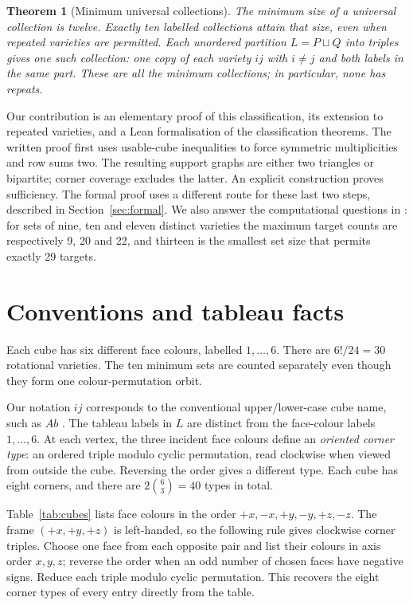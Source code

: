 \documentclass[11pt]{article}
\newtheorem{theorem}{Theorem}
\begin{document}
\begin{theorem}[Minimum universal collections]\label{thm:main}
The minimum size of a universal collection is twelve. Exactly ten labelled
collections attain that size, even when repeated varieties are permitted.
Each unordered partition $L=P\sqcup Q$ into triples gives one such
collection: one copy of each variety $ij$ with $i\ne j$ and both labels
in the same part. These are all the minimum collections; in particular, none has repeats.
\end{theorem}

Our contribution is an elementary proof of this classification, its extension
to repeated varieties, and a Lean formalisation of the classification
theorems. The written proof first uses usable-cube inequalities to force
symmetric multiplicities and row sums two. The resulting support graphs are
either two triangles or bipartite; corner coverage excludes the latter.
An explicit construction proves sufficiency. The formal proof uses a different
route for these last two steps, described in Section~\ref{sec:formal}.
We also answer the computational questions in \cite[Section~6]{JR}: for
sets of nine, ten and eleven distinct varieties the maximum target counts
are respectively 9, 20 and 22, and thirteen is the smallest set size
that permits exactly 29 targets.

\section{Conventions and tableau facts}\label{sec:tableau}
Each cube has six different face colours, labelled $1,\ldots,6$.
There are $6!/24=30$ rotational varieties. The ten minimum sets are counted
separately even though they form one colour-permutation orbit.

Our notation $ij$ corresponds to the conventional upper/lower-case cube
name, such as $Ab$ \cite[Section~3]{B2017}. The tableau labels in $L$ are
distinct from the face-colour labels $1,\ldots,6$. At each vertex, the three incident face colours define an
\emph{oriented corner type}: an ordered triple modulo cyclic permutation,
read clockwise when viewed from outside the cube.
Reversing the order gives a different type.
Each cube has eight corners, and there are $2\binom63=40$ types in total.

Table~\ref{tab:cubes} lists face colours in the order $+x,-x,+y,-y,+z,-z$. The frame $(+x,+y,+z)$ is
left-handed, so the following rule gives clockwise corner triples.
Choose one face from each opposite pair and list their colours in axis
order $x,y,z$; reverse the order when an odd number of chosen faces have
negative signs. Reduce each triple modulo cyclic permutation. This recovers
the eight corner types of every entry directly from the table.
\end{document}
